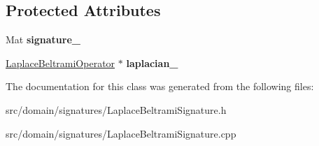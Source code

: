 \subsection*{Protected Attributes}
\begin{DoxyCompactItemize}
\item 
\hypertarget{class_laplace_beltrami_signature_a5b0b11e9e61e889862246dd03a29d665}{}Mat {\bfseries signature\+\_\+}\label{class_laplace_beltrami_signature_a5b0b11e9e61e889862246dd03a29d665}

\item 
\hypertarget{class_laplace_beltrami_signature_af1fd997251e367f55f5fbaa7a75c8663}{}\hyperlink{class_laplace_beltrami_operator}{Laplace\+Beltrami\+Operator} $\ast$ {\bfseries laplacian\+\_\+}\label{class_laplace_beltrami_signature_af1fd997251e367f55f5fbaa7a75c8663}

\end{DoxyCompactItemize}


The documentation for this class was generated from the following files\+:\begin{DoxyCompactItemize}
\item 
src/domain/signatures/Laplace\+Beltrami\+Signature.\+h\item 
src/domain/signatures/Laplace\+Beltrami\+Signature.\+cpp\end{DoxyCompactItemize}
